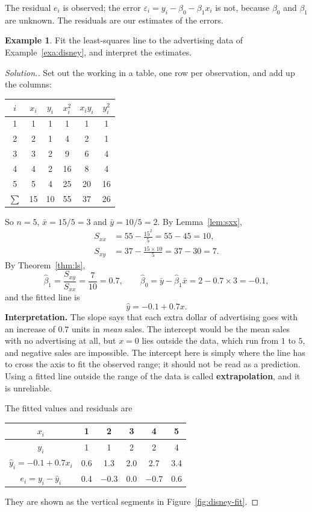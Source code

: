 \documentclass[11pt,a4paper]{article}
\numberwithin{equation}{section}
\theoremstyle{definition}
\newtheorem{exa}[thm]{Example}
\newenvironment{solution}
  {\renewcommand{\qedsymbol}{}\begin{proof}[\textit{Solution}.]}
  {\end{proof}}
\begin{document}
The residual $e_i$ is observed; the error $\varepsilon_i = y_i - \beta_0 - \beta_1 x_i$ is
not, because $\beta_0$ and $\beta_1$ are unknown. The residuals are our estimates of the
errors.

\begin{exa}\label{exa:disney-fit}
Fit the least-squares line to the advertising data of Example~\ref{exa:disney}, and interpret
the estimates.
\end{exa}

\begin{solution}
Set out the working in a table, one row per observation, and add up the columns:
\begin{center}
\begin{tabular}{c|ccccc}
$i$ & $x_i$ & $y_i$ & $x_i^2$ & $x_i y_i$ & $y_i^2$ \\
\hline
1 & 1 & 1 & 1 & 1 & 1 \\
2 & 2 & 1 & 4 & 2 & 1 \\
3 & 3 & 2 & 9 & 6 & 4 \\
4 & 4 & 2 & 16 & 8 & 4 \\
5 & 5 & 4 & 25 & 20 & 16 \\
\hline
$\sum$ & 15 & 10 & 55 & 37 & 26 \\
\end{tabular}
\end{center}
So $n = 5$, $\bar x = 15/5 = 3$ and $\bar y = 10/5 = 2$. By Lemma~\ref{lem:sxx},
\begin{align*}
S_{xx} &= 55 - \frac{15^2}{5} = 55 - 45 = 10, \\
S_{xy} &= 37 - \frac{15 \times 10}{5} = 37 - 30 = 7 .
\end{align*}
By Theorem~\ref{thm:ls},
\[
\hat\beta_1 = \frac{S_{xy}}{S_{xx}} = \frac{7}{10} = 0.7, \qquad
\hat\beta_0 = \bar y - \hat\beta_1 \bar x = 2 - 0.7 \times 3 = -0.1 ,
\]
and the fitted line is
\[
\hat y = -0.1 + 0.7x .
\]
\textbf{Interpretation.} The slope says that each extra dollar of advertising goes with an
increase of $0.7$ units in \emph{mean} sales. The intercept would be the mean sales with no
advertising at all, but $x = 0$ lies outside the data, which run from $1$ to $5$, and
negative sales are impossible. The intercept here is simply where the line has to cross the
axis to fit the observed range; it should not be read as a prediction. Using a fitted line
outside the range of the data is called \textbf{extrapolation}, and it is unreliable.

The fitted values and residuals are
\begin{center}
\begin{tabular}{c|ccccc}
$x_i$ & 1 & 2 & 3 & 4 & 5 \\
\hline
$y_i$ & 1 & 1 & 2 & 2 & 4 \\
$\hat y_i = -0.1 + 0.7x_i$ & 0.6 & 1.3 & 2.0 & 2.7 & 3.4 \\
$e_i = y_i - \hat y_i$ & 0.4 & $-0.3$ & 0.0 & $-0.7$ & 0.6 \\
\end{tabular}
\end{center}
They are shown as the vertical segments in Figure~\ref{fig:disney-fit}.
\end{solution}
\end{document}
